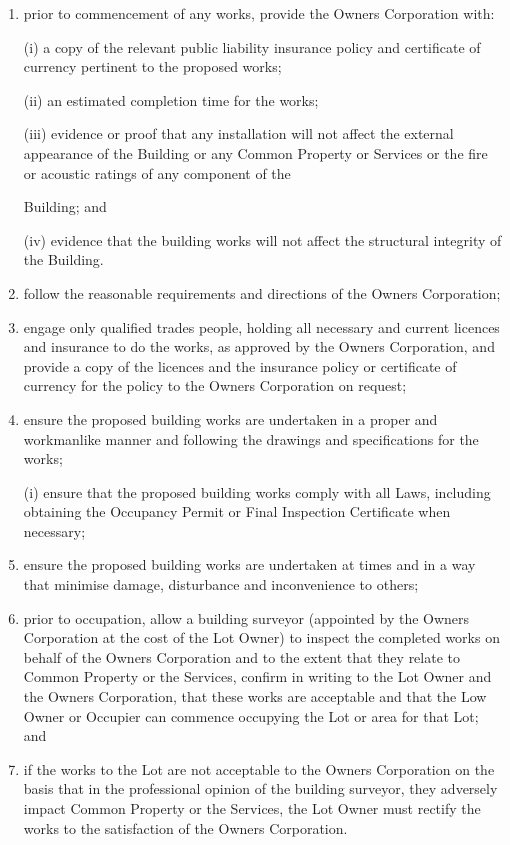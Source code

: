 \documentclass{article}
\begin{document}
\begin{enumerate}[label=\arabic*.]
\begin{enumerate}[label=\arabic{enumi}.\arabic*.]
\begin{enumerate}[label=(\arabic*)]
\begin{enumerate}[label=(\alph*)]
\item  prior to commencement of any works, provide the Owners Corporation with:

(i) a copy of the relevant public liability insurance policy and certificate of currency pertinent to the proposed works;

(ii) an estimated completion time for the works;

(iii) evidence or proof that any installation will not affect the external appearance of the Building or any Common Property or Services or the fire or acoustic ratings of any component of the
\newpage

Building; and

(iv) evidence that the building works will not affect the structural integrity of the Building.

\item  follow the reasonable requirements and directions of the Owners Corporation;

\item  engage only qualified trades people, holding all necessary and current licences and insurance to do the works, as approved by the Owners Corporation, and provide a copy of the licences and the insurance policy or certificate of currency for the policy to the Owners Corporation on request;

\item  ensure the proposed building works are undertaken in a proper and workmanlike manner and following the drawings and specifications for the works;

(i) ensure that the proposed building works comply with all Laws, including obtaining the Occupancy Permit or Final Inspection Certificate when necessary;

\item  ensure the proposed building works are undertaken at times and in a way that minimise damage, disturbance and inconvenience to others;

\item  prior to occupation, allow a building surveyor (appointed by the Owners Corporation at the cost of the Lot Owner) to inspect the completed works on behalf of the Owners Corporation and to the extent that they relate to Common Property or the Services, confirm in writing to the Lot Owner and the Owners Corporation, that these works are acceptable and that the Low Owner or Occupier can commence occupying the Lot or area for that Lot; and

\item  if the works to the Lot are not acceptable to the Owners Corporation on the basis that in the professional opinion of the building surveyor, they adversely impact Common Property or the Services, the Lot Owner must rectify the works to the satisfaction of the Owners Corporation.


\end{enumerate}
\end{enumerate}
\end{enumerate}
\end{enumerate}
\end{document}
